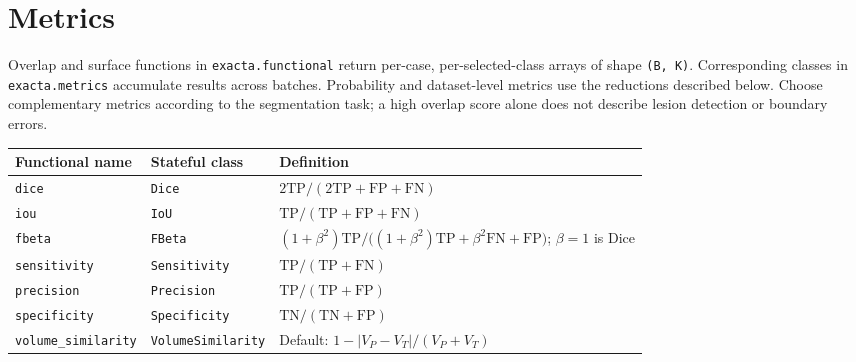 \chapter{Metrics}\label{ch:metrics}

Overlap and surface functions in \texttt{exacta.functional} return per-case, per-selected-class
arrays of shape \texttt{(B,\ K)}. Corresponding classes in \texttt{exacta.metrics} accumulate results across
batches. Probability and dataset-level metrics use the reductions described below.
Choose complementary metrics according to the segmentation task; a high overlap score alone
does not describe lesion detection or boundary errors.

{\small{} %
\begin{longtable}[]{@{}
  >{\raggedright\arraybackslash}p{}
  >{\raggedright\arraybackslash}p{}
  >{\raggedright\arraybackslash}p{}@{}}
\toprule\noalign{}
\begin{minipage}[b]{\linewidth}\raggedright
Functional name
\end{minipage} & \begin{minipage}[b]{\linewidth}\raggedright
Stateful class
\end{minipage} & \begin{minipage}[b]{\linewidth}\raggedright
Definition
\end{minipage} \\
\midrule\noalign{}
\endhead
\bottomrule\noalign{}
\endlastfoot
\texttt{dice} & \texttt{Dice} & \(2\mathrm{TP}/(2\mathrm{TP}+\mathrm{FP}+\mathrm{FN})\) \\
\texttt{iou} & \texttt{IoU} & \(\mathrm{TP}/(\mathrm{TP}+\mathrm{FP}+\mathrm{FN})\) \\
\texttt{fbeta} & \texttt{FBeta} & \((1+\beta^2)\mathrm{TP}/\big((1+\beta^2)\mathrm{TP}+\beta^2\mathrm{FN}+\mathrm{FP}\big)\); \(\beta=1\) is Dice \\
\texttt{sensitivity} & \texttt{Sensitivity} & \(\mathrm{TP}/(\mathrm{TP}+\mathrm{FN})\) \\
\texttt{precision} & \texttt{Precision} & \(\mathrm{TP}/(\mathrm{TP}+\mathrm{FP})\) \\
\texttt{specificity} & \texttt{Specificity} & \(\mathrm{TN}/(\mathrm{TN}+\mathrm{FP})\) \\
\texttt{volume\_similarity} & \texttt{VolumeSimilarity} & Default: \(1-\lvert V_P-V_T\rvert/(V_P+V_T)\) \\

\end{longtable}}
